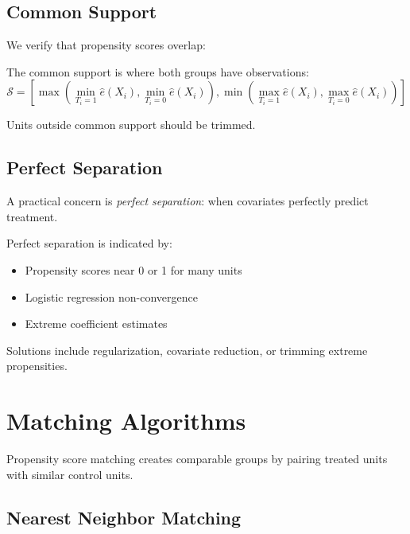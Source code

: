 \subsection{Common Support}

We verify that propensity scores overlap:

\begin{definition}
\label{def:common_support}
The common support is where both groups have observations:
\begin{equation}
\mathcal{S} = \left[\max\left(\min_{T_i=1} \hat{e}(X_i), \min_{T_i=0} \hat{e}(X_i)\right),
               \min\left(\max_{T_i=1} \hat{e}(X_i), \max_{T_i=0} \hat{e}(X_i)\right)\right]
\label{eq:common_support}
\end{equation}
\end{definition}

Units outside common support should be trimmed.

\subsection{Perfect Separation}

A practical concern is \emph{perfect separation}: when covariates perfectly predict treatment.

\begin{remark}
Perfect separation is indicated by:
\begin{itemize}
    \item Propensity scores near 0 or 1 for many units
    \item Logistic regression non-convergence
    \item Extreme coefficient estimates
\end{itemize}
Solutions include regularization, covariate reduction, or trimming extreme propensities.
\end{remark}


\section{Matching Algorithms}
\label{sec:matching_algorithms}

Propensity score matching creates comparable groups by pairing treated units with similar control units.

\subsection{Nearest Neighbor Matching}

